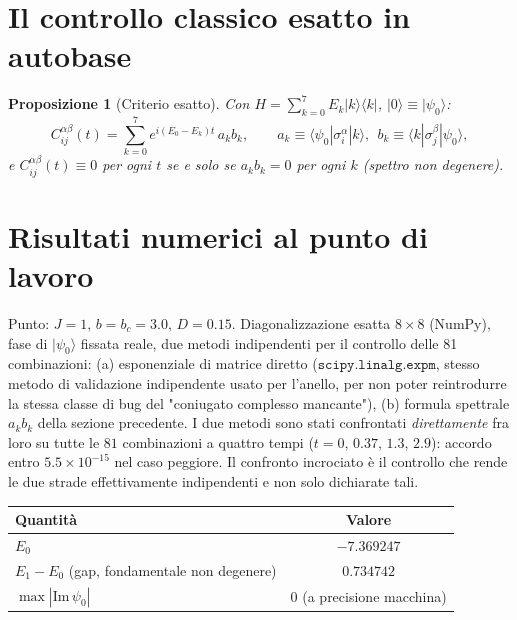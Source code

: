 \documentclass[11pt,a4paper]{article}
\newtheorem{proposizione}{Proposizione}
\newcommand{\ket}[1]{\lvert #1 \rangle}
\newcommand{\bra}[1]{\langle #1 \rvert}
\begin{document}
\section{Il controllo classico esatto in autobase}

\begin{proposizione}[Criterio esatto]
Con $H=\sum_{k=0}^7 E_k\ket k\bra k$, $\ket0\equiv\ket{\psi_0}$:
\begin{equation}
C_{ij}^{\alpha\beta}(t)=\sum_{k=0}^7 e^{i(E_0-E_k)t}\,a_k b_k,
\qquad a_k\equiv\langle\psi_0|\sigma_i^\alpha|k\rangle,\ \ b_k\equiv\langle k|\sigma_j^\beta|\psi_0\rangle,
\end{equation}
e $C_{ij}^{\alpha\beta}(t)\equiv0$ per ogni $t$ se e solo se $a_kb_k=0$ per ogni $k$ (spettro non
degenere).
\end{proposizione}

\section{Risultati numerici al punto di lavoro}
\label{sec:numerico}

Punto: $J=1,\,b=b_c=3.0,\,D=0.15$. Diagonalizzazione esatta $8\times8$ (NumPy), fase di
$\ket{\psi_0}$ fissata reale, due metodi indipendenti per il controllo delle 81 combinazioni:
(a) esponenziale di matrice diretto ($\texttt{scipy.linalg.expm}$, stesso metodo di validazione
indipendente usato per l'anello, per non poter reintrodurre la stessa classe di bug del
"coniugato complesso mancante"), (b) formula spettrale $a_kb_k$ della sezione precedente.
I due metodi sono stati confrontati \emph{direttamente} fra loro su tutte le $81$ combinazioni a
quattro tempi ($t=0,\,0.37,\,1.3,\,2.9$): accordo entro $5.5\times10^{-15}$ nel caso peggiore.
Il confronto incrociato è il controllo che rende le due strade effettivamente indipendenti e non
solo dichiarate tali.

\begin{center}
\renewcommand{\arraystretch}{1.2}
\begin{tabular}{@{}lc@{}}
\toprule
Quantità & Valore \\
\midrule
$E_0$ & $-7.369247$ \\
$E_1-E_0$ (gap, fondamentale non degenere) & $0.734742$ \\
$\max|\mathrm{Im}\,\psi_0|$ & $0$ (a precisione macchina) \\
\bottomrule
\end{tabular}
\end{center}
\end{document}
